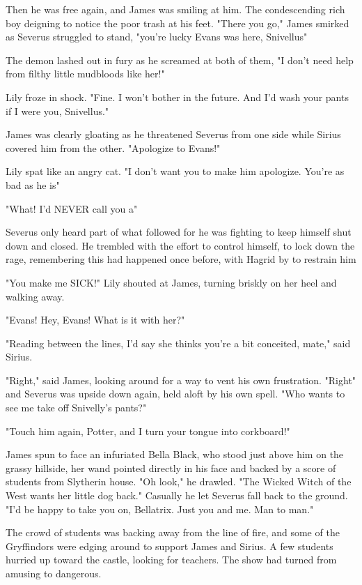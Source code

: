 Then he was free again, and James was smiling at him. The condescending rich boy deigning to notice the poor trash at his feet. "There you go," James smirked as Severus struggled to stand, "you're lucky Evans was here, Snivellus{\el}"

The demon lashed out in fury as he screamed at both of them, "I don't need help from filthy little mudbloods like her!"

Lily froze in shock. "Fine. I won't bother in the future. And I'd wash your pants if I were you, Snivellus."

James was clearly gloating as he threatened Severus from one side while Sirius covered him from the other. "Apologize to Evans!"

Lily spat like an angry cat. "I don't want you to make him apologize. You're as bad as he is{\el}"

"What! I'd NEVER call you a{\el}"

Severus only heard part of what followed for he was fighting to keep himself shut down and closed. He trembled with the effort to control himself, to lock down the rage, remembering this had happened once before, with Hagrid by to restrain him{\el}

"You make me SICK!" Lily shouted at James, turning briskly on her heel and walking away.

"Evans! Hey, Evans! What is it with her?"

"Reading between the lines, I'd say she thinks you're a bit conceited, mate," said Sirius.

"Right," said James, looking around for a way to vent his own frustration. "Right{\el}" and Severus was upside down again, held aloft by his own spell. "Who wants to see me take off Snivelly's pants?"

"Touch him again, Potter, and I turn your tongue into corkboard!"

James spun to face an infuriated Bella Black, who stood just above him on the grassy hillside, her wand pointed directly in his face and backed by a score of students from Slytherin house. "Oh look," he drawled. "The Wicked Witch of the West wants her little dog back." Casually he let Severus fall back to the ground. "I'd be happy to take you on, Bellatrix. Just you and me. Man to man."

The crowd of students was backing away from the line of fire, and some of the Gryffindors were edging around to support James and Sirius. A few students hurried up toward the castle, looking for teachers. The show had turned from amusing to dangerous.

